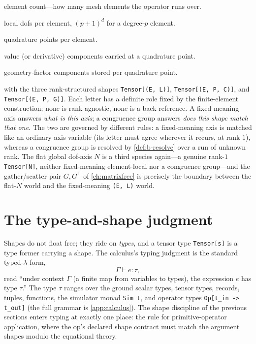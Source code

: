 \begin{description}[leftmargin=1.6em, style=nextline, nosep]
\item[\texttt{E}] element count---how many mesh elements the operator runs over.
\item[\texttt{L}] local dofs per element, $(p+1)^d$ for a degree-$p$ element.
\item[\texttt{P}] quadrature points per element.
\item[\texttt{C}] value (or derivative) components carried at a quadrature point.
\item[\texttt{G}] geometry-factor components stored per quadrature point.
\end{description}

\noindent with the three rank-structured shapes
\lstinline[style=l4style]|Tensor[(E, L)]|, \lstinline[style=l4style]|Tensor[(E, P, C)]|,
and \lstinline[style=l4style]|Tensor[(E, P, G)]|. Each letter has a definite role
fixed by the finite-element construction; none is rank-agnostic, none is a
back-reference. A fixed-meaning axis answers \emph{what is this axis}; a congruence
group answers \emph{does this shape match that one}. The two are governed by
different rules: a fixed-meaning axis is matched like an ordinary axis variable
(its letter must agree wherever it recurs, at rank $1$), whereas a congruence group
is resolved by \cref{def:b-resolve} over a run of unknown rank. The flat global
dof-axis $N$ is a third species again---a genuine rank-$1$
\lstinline[style=l4style]|Tensor[N]|, neither fixed-meaning element-local nor a
congruence group---and the gather/scatter pair $G,G^{\mathsf T}$ of
\cref{ch:matrixfree} is precisely the boundary between the flat-$N$ world and the
fixed-meaning \lstinline[style=l4style]|(E, L)| world.

\section{The type-and-shape judgment}
\label{sec:b-judgment}

Shapes do not float free; they ride on \emph{types}, and a tensor type
\lstinline[style=l4style]|Tensor[s]| is a type former carrying a shape. The
calculus's typing judgment is the standard typed-$\lambda$ form,
\[
  \Gamma \vdash e : \tau,
\]
read ``under context $\Gamma$ (a finite map from variables to types), the
expression $e$ has type $\tau$.'' The type $\tau$ ranges over the ground scalar
types, tensor types, records, tuples, functions, the simulator monad
\lstinline[style=l4style]|Sim t|, and operator types
\lstinline[style=l4style]|Op[t_in -> t_out]| (the full grammar is
\cref{app:calculus}). The shape discipline of the previous sections enters typing
at exactly one place: the rule for primitive-operator application, where the op's
declared shape contract must match the argument shapes modulo the equational theory.

